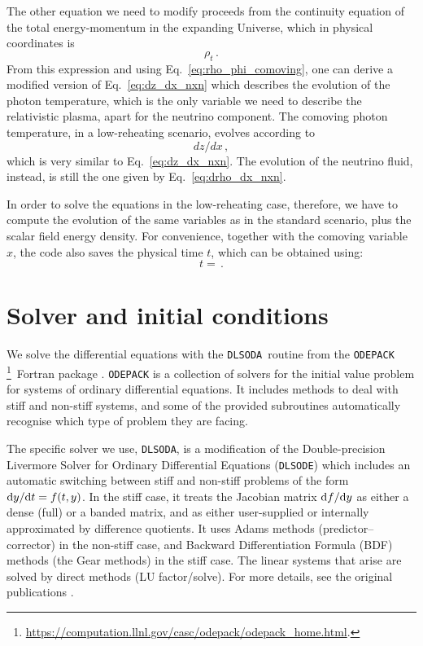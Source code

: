 \documentclass[notitlepage,showpacs,preprintnumbers,amsmath,amssymb,superscriptaddress,prd,onecolumn]{revtex4-1}
\newcommand{\dlsoda}{\texttt{DLSODA}}
\begin{document}
The other equation we need to modify proceeds from the continuity equation
of the total energy-momentum in the expanding Universe,
which in physical coordinates is
\begin{equation}
\label{eq:continuity}
\rho_t
\,.
\end{equation}
From this expression and using Eq.~\eqref{eq:rho_phi_comoving},
one can derive a modified version of Eq.~\eqref{eq:dz_dx_nxn}
which describes the evolution of the photon temperature,
which is the only variable we need to describe the relativistic plasma,
apart for the neutrino component.
The comoving photon temperature, in a low-reheating scenario, evolves according to
\begin{equation}
dz/dx
\,,
\end{equation}
which is very similar to Eq.~\eqref{eq:dz_dx_nxn}.
The evolution of the neutrino fluid, instead, is still the one given by Eq.~\eqref{eq:drho_dx_nxn}.

In order to solve the equations in the low-reheating case, therefore,
we have to compute the evolution of the same variables as in the standard scenario,
plus the scalar field energy density.
For convenience, together with the comoving variable $x$, the code also saves the physical time $t$,
which can be obtained using:
\begin{equation}
\label{eq:time_def_rh}
t
=
\,.
\end{equation}


\section{Solver and initial conditions}
\label{ssec:solver}
We solve the differential equations with the \dlsoda\ routine
from the \texttt{ODEPACK}%
\footnote{\url{https://computation.llnl.gov/casc/odepack/odepack_home.html}.}\
Fortran package \cite{hindmarsh1982odepack,dlsoda1}.
\texttt{ODEPACK} is a collection of solvers for the initial value problem for systems of ordinary differential equations.
It includes methods to deal with stiff and non-stiff systems, and some of the provided subroutines
automatically recognise which type of problem they are facing.

The specific solver we use, \dlsoda,
is a modification of the Double-precision Livermore Solver for Ordinary Differential Equations (\texttt{DLSODE})
which includes an automatic switching between stiff and non-stiff problems
of the form ${\rm d}y/{\rm d}t = f(t,y)$.
In the stiff case, it treats the Jacobian matrix ${\rm d}f/{\rm d}y$ as either a dense (full) or a banded matrix, and as either user-supplied or internally approximated by difference quotients.
It uses Adams methods (predictor--corrector) in the non-stiff case, and Backward Differentiation Formula (BDF) methods (the Gear methods) in the stiff case.
The linear systems that arise are solved by direct methods (LU factor/solve).
For more details, see the original publications  \cite{hindmarsh1982odepack,dlsoda1}.
\end{document}
